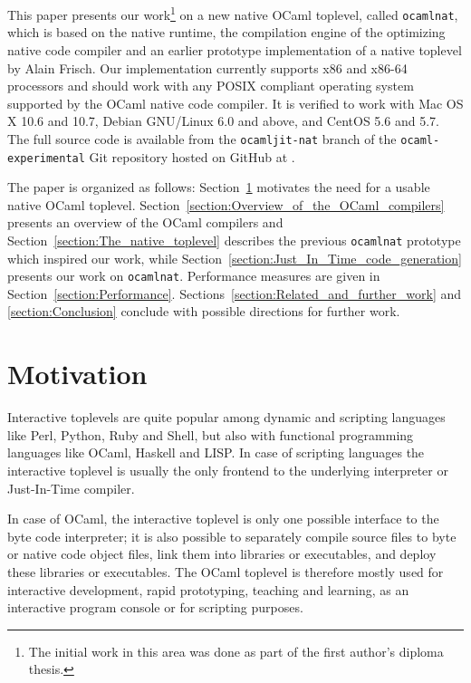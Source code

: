 \documentclass[10pt,a4paper,draft,twocolumn]{article}
\begin{document}
This paper presents our work\footnote{The initial work in this area was done as part of the first
author's diploma thesis.} on a new native OCaml toplevel, called \texttt{ocamlnat}, which is
based on the native runtime, the compilation engine of the optimizing native code compiler and
an earlier prototype implementation of a native toplevel by Alain Frisch. Our implementation
currently supports x86 and x86-64 processors \cite{Amd09Vol1,Intel10Vol1} and should work with any
POSIX compliant operating system supported by the OCaml native code compiler. It is verified to
work with Mac OS X 10.6 and 10.7, Debian GNU/Linux 6.0 and above, and CentOS 5.6 and 5.7. The
full source code is available from the \texttt{ocamljit-nat} branch of the \texttt{ocaml-experimental}
Git repository hosted on GitHub at \cite{Meurer11ocamlexperimental}.

The paper is organized as follows: Section~\ref{section:Motivation} motivates the need for a
usable native OCaml toplevel. Section~\ref{section:Overview_of_the_OCaml_compilers} presents
an overview of the OCaml compilers and Section~\ref{section:The_native_toplevel} describes the
previous \texttt{ocamlnat} prototype which inspired our work, while
Section~\ref{section:Just_In_Time_code_generation} presents our work on \texttt{ocamlnat}.
Performance measures are given in Section~\ref{section:Performance}.
Sections~\ref{section:Related_and_further_work} and \ref{section:Conclusion} conclude with
possible directions for further work.


\section{Motivation} \label{section:Motivation}

Interactive toplevels are quite popular among dynamic and scripting languages like Perl, Python, Ruby
and Shell, but also with functional programming languages like OCaml, Haskell and LISP. In case of
scripting languages the interactive toplevel is usually the only frontend to the underlying interpreter
or Just-In-Time compiler.

In case of OCaml, the interactive toplevel is only one possible interface to the byte code interpreter;
it is also possible to separately compile source files to byte or native code object files, link them
into libraries or executables,
and deploy these libraries or executables. The OCaml toplevel is therefore mostly used for
interactive development, rapid prototyping, teaching and learning, as an interactive program console
or for scripting purposes.
\end{document}
